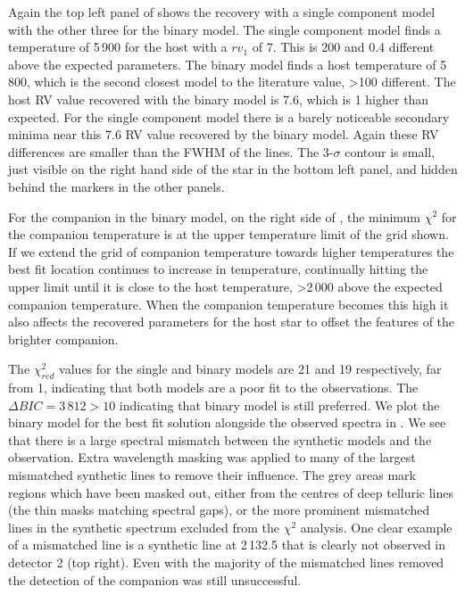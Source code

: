 Again the top left panel of  shows the recovery with a single component model with the other three for the binary model. The single component model finds a temperature of 5\,900\K{} for the host with a \({rv}_1\) of 7\kmps{}. This is 200\K{} and 0.4\kmps{} different above the expected parameters. The binary model finds a host temperature of 5\,800\K{}, which is the second closest model to the literature value, >100\K{} different. The host {RV} value recovered with the binary model is 7.6\kmps{}, which is 1\kmps{} higher than expected.  For the single component model there is a barely noticeable secondary minima near this 7.6\kmps{} {RV} value recovered by the binary model. Again these {RV} differences are smaller than the {FWHM} of the lines. The 3-\(\sigma\) contour is small, just visible on the right hand side of the star in the bottom left panel, and hidden behind the markers in the other panels.


For the companion in the binary model, on the right side of , the minimum \(\chi^2\) for the companion temperature is at the upper temperature limit of the grid shown. If we extend the grid of companion temperature towards higher temperatures the best fit location continues to increase in temperature, continually hitting the upper limit until it is close to the host temperature, >2\,000\K{} above the expected companion temperature. When the companion temperature becomes this high it also affects the recovered parameters for the host star to offset the features of the brighter companion.

The \(\chi^2_{red}\) values for the single and binary models are 21 and 19 respectively, far from 1, indicating that both models are a poor fit to the observations. {\rd{} The $\Delta {BIC} = 3\,812 >10$ indicating that binary model is still preferred.} We plot the binary model for the best fit solution alongside the observed spectra in . We see that there is a large spectral mismatch between the synthetic models and the observation. Extra wavelength masking was applied to many of the largest mismatched synthetic lines to remove their influence. The grey areas mark regions which have been masked out, either from the centres of deep telluric lines (the thin masks matching spectral gaps), or the more prominent mismatched lines in the synthetic spectrum excluded from the \(\chi^2\) analysis. One clear example of a mismatched line is a synthetic line at 2\,132.5\nm{} that is clearly not observed in detector 2 (top right). Even with the majority of the mismatched lines removed the detection of the companion was still unsuccessful.

